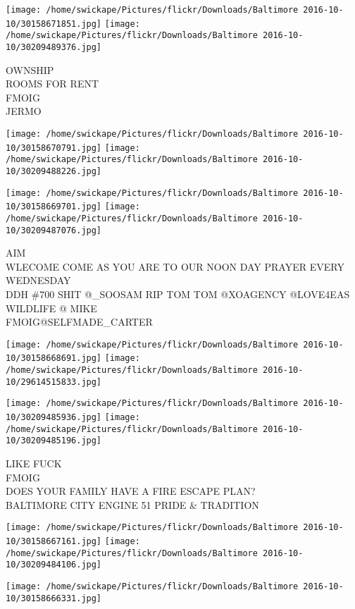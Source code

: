 \documentclass[10pt,letterpaper]{article}
\begin{document}
\texttt{[image: /home/swickape/Pictures/flickr/Downloads/Baltimore 2016-10-10/30158671851.jpg]}
\texttt{[image: /home/swickape/Pictures/flickr/Downloads/Baltimore 2016-10-10/30209489376.jpg]}

OWNSHIP\\
ROOMS FOR RENT\\
FMOIG\\
JERMO\\
\pagebreak

\texttt{[image: /home/swickape/Pictures/flickr/Downloads/Baltimore 2016-10-10/30158670791.jpg]}
\texttt{[image: /home/swickape/Pictures/flickr/Downloads/Baltimore 2016-10-10/30209488226.jpg]}

\texttt{[image: /home/swickape/Pictures/flickr/Downloads/Baltimore 2016-10-10/30158669701.jpg]}
\texttt{[image: /home/swickape/Pictures/flickr/Downloads/Baltimore 2016-10-10/30209487076.jpg]}

AIM\\
WLECOME COME AS YOU ARE TO OUR NOON DAY PRAYER EVERY WEDNESDAY\\
DDH \#700 SHIT @\_SOOSAM RIP TOM TOM @XOAGENCY @LOVE4EAS WILDLIFE @ MIKE\\
FMOIG@SELFMADE\_CARTER\\
\pagebreak

\texttt{[image: /home/swickape/Pictures/flickr/Downloads/Baltimore 2016-10-10/30158668691.jpg]}
\texttt{[image: /home/swickape/Pictures/flickr/Downloads/Baltimore 2016-10-10/29614515833.jpg]}

\texttt{[image: /home/swickape/Pictures/flickr/Downloads/Baltimore 2016-10-10/30209485936.jpg]}
\texttt{[image: /home/swickape/Pictures/flickr/Downloads/Baltimore 2016-10-10/30209485196.jpg]}

LIKE FUCK\\
FMOIG\\
DOES YOUR FAMILY HAVE A FIRE ESCAPE PLAN?\\
BALTIMORE CITY ENGINE 51 PRIDE \& TRADITION\\
\pagebreak

\texttt{[image: /home/swickape/Pictures/flickr/Downloads/Baltimore 2016-10-10/30158667161.jpg]}
\texttt{[image: /home/swickape/Pictures/flickr/Downloads/Baltimore 2016-10-10/30209484106.jpg]}

\texttt{[image: /home/swickape/Pictures/flickr/Downloads/Baltimore 2016-10-10/30158666331.jpg]}
\end{document}
